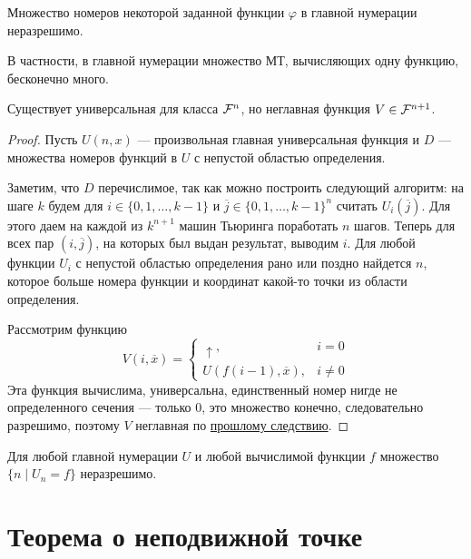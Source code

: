 \begin{cor}\label{cor:4}
    Множество номеров некоторой заданной функции $ \varphi $ в главной нумерации неразрешимо.

	В частности, в главной нумерации множество МТ, вычисляющих одну функцию, бесконечно много.
\end{cor}

\begin{cor}\label{cor:5}
	Существует универсальная для класса $ \mathcal{F}^{n}$, но неглавная функция $ V \in \mathcal{F}^{n+1}$.
\end{cor}
\begin{proof}
	Пусть $ U(n, x)$ --- произвольная главная универсальная функция и $ D$ --- множества номеров функций в $ U$ с непустой областью определения. 

	\vspace{1em}
	Заметим, что $ D$ перечислимое, так как можно построить следующий алгоритм: на шаге $ k$ будем для $ i \in \{0, 1, \ldots , k-1\}$ и $ \overline{j} \in \{0, 1, \ldots, k-1\}^{n}$ считать $ U_{i}(\overline{j})$. Для этого даем на каждой из $ k^{n+1}$ машин Тьюринга поработать $ n$ шагов. Теперь для всех пар $ (i, \overline{j})$, на которых был выдан результат, выводим $ i$. Для любой функции  $ U_i$ с непустой областью определения рано или поздно найдется $ n$, которое больше номера функции и  координат какой-то точки из области определения.
	\vspace{1em}

	Рассмотрим функцию
	\[
		V(i, \overline{x}) = \begin{cases}
			\uparrow, & i = 0 \\
			U(f(i-1), \overline{x}), & i \ne 0
		\end{cases}
	\] 
	Эта функция вычислима, универсальна, единственный номер нигде не определенного сечения --- только $ 0$, это множество конечно, следовательно разрешимо, поэтому $ V$ неглавная по \hyperref[cor:4]{прошлому следствию}.
\end{proof}
\begin{cor}
	Для любой главной нумерации $ U$ и любой вычислимой функции $ f$  множество $ \{n \mid U_n = f\}$ неразрешимо.
\end{cor}


\section{Теорема о неподвижной точке}

